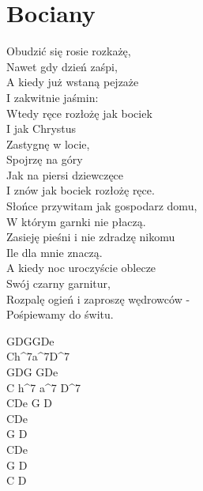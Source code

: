 \section{Bociany}
\noindent %
\begin{minipage}[t]{\dimexpr.4\textwidth-.4\columnsep}
    Obudzić się rosie rozkażę,\\
    Nawet gdy dzień zaśpi,\\
    A kiedy już wstaną pejzaże\\
    I zakwitnie jaśmin:\\
    \hfill\break
    \vin Wtedy ręce rozłożę jak bociek\\
    \vin I jak Chrystus\\
    \vin Zastygnę w locie,\\
    \vin Spojrzę na góry\\
    \vin Jak na piersi dziewczęce\\
    \vin I znów jak bociek rozłożę ręce.\\
    \hfill\break
    Słońce przywitam jak gospodarz domu,\\
    W którym garnki nie płaczą.\\
    Zasieję pieśni i nie zdradzę nikomu\\
    Ile dla mnie znaczą.\\
    \hfill\break
    A kiedy noc uroczyście oblecze\\
    Swój czarny garnitur,\\
    Rozpalę ogień i zaproszę wędrowców -\\
    Pośpiewamy do świtu.
\end{minipage}
\hfill\begin{minipage}[t]{\dimexpr.07\textwidth-.07\columnsep}
    \ifchorded %
    GDGGDe\\
    Ch^7a^7D^7\\
    GDG GDe\\
    C h^7 a^7 D^7\\
    \hfill\break
    CDe G D\\
    CDe\\
    G D\\
    CDe\\
    G D\\
    C D\\
    \vfill
    \else
    \fi
\end{minipage}